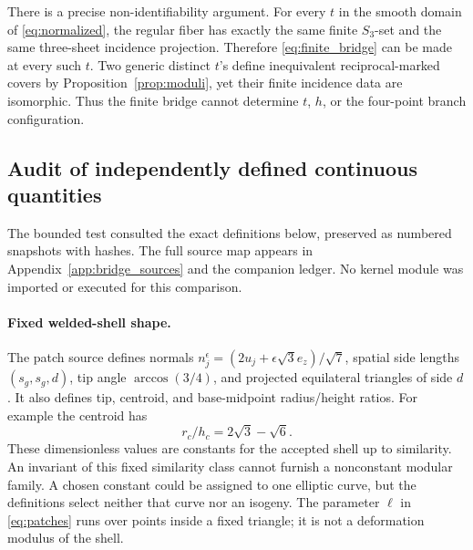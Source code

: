 There is a precise non-identifiability argument. For every \(t\) in the smooth domain of \eqref{eq:normalized}, the regular fiber has exactly the same finite \(S_3\)-set and the same three-sheet incidence projection. Therefore \eqref{eq:finite_bridge} can be made at every such \(t\). Two generic distinct \(t\)'s define inequivalent reciprocal-marked covers by Proposition~\ref{prop:moduli}, yet their finite incidence data are isomorphic. Thus the finite bridge cannot determine \(t\), \(h\), or the four-point branch configuration.

\subsection{Audit of independently defined continuous quantities}
The bounded test consulted the exact definitions below, preserved as numbered snapshots with hashes. The full source map appears in Appendix~\ref{app:bridge_sources} and the companion ledger. No kernel module was imported or executed for this comparison.

\paragraph{Fixed welded-shell shape.}
The patch source defines normals
\(n_j^\epsilon=(2u_j+\epsilon\sqrt3e_z)/\sqrt7\),
spatial side lengths \((s_g,s_g,d)\), tip angle \(\arccos(3/4)\), and projected equilateral triangles of side \(d\). It also defines tip, centroid, and base-midpoint radius/height ratios. For example the centroid has
\begin{equation}\label{eq:fixed_ratio}
 r_c/h_c=2\sqrt3-\sqrt6.
\end{equation}
These dimensionless values are constants for the accepted shell up to similarity. An invariant of this fixed similarity class cannot furnish a nonconstant modular family. A chosen constant could be assigned to one elliptic curve, but the definitions select neither that curve nor an isogeny. The parameter \(\ell\) in \eqref{eq:patches} runs over points inside a fixed triangle; it is not a deformation modulus of the shell.

